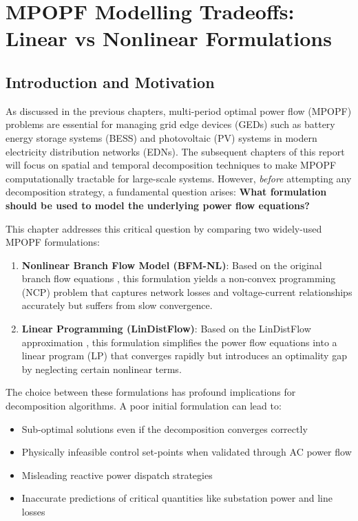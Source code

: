 
\section{MPOPF Modelling Tradeoffs: Linear vs Nonlinear Formulations}

\subsection{Introduction and Motivation}

As discussed in the previous chapters, multi-period optimal power flow (MPOPF) problems are essential for managing grid edge devices (GEDs) such as battery energy storage systems (BESS) and photovoltaic (PV) systems in modern electricity distribution networks (EDNs). The subsequent chapters of this report will focus on spatial and temporal decomposition techniques to make MPOPF computationally tractable for large-scale systems. However, \textit{before} attempting any decomposition strategy, a fundamental question arises: \textbf{What formulation should be used to model the underlying power flow equations?}

This chapter addresses this critical question by comparing two widely-used MPOPF formulations:
\begin{enumerate}
    \item \textbf{Nonlinear Branch Flow Model (BFM-NL)}: Based on the original branch flow equations \cite{Farivar1}, this formulation yields a non-convex programming (NCP) problem that captures network losses and voltage-current relationships accurately but suffers from slow convergence.
    \item \textbf{Linear Programming (LinDistFlow)}: Based on the LinDistFlow approximation \cite{Gan}, this formulation simplifies the power flow equations into a linear program (LP) that converges rapidly but introduces an optimality gap by neglecting certain nonlinear terms.
\end{enumerate}

The choice between these formulations has profound implications for decomposition algorithms. A poor initial formulation can lead to:
\begin{itemize}
    \item Sub-optimal solutions even if the decomposition converges correctly
    \item Physically infeasible control set-points when validated through AC power flow
    \item Misleading reactive power dispatch strategies
    \item Inaccurate predictions of critical quantities like substation power and line losses
\end{itemize}

